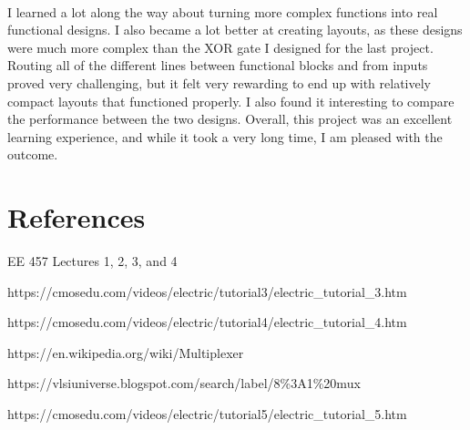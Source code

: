 \documentclass{article}
\begin{document}
  \paragraph{}
  I learned a lot along the way about turning more complex functions into real functional designs. I also became a lot better at creating layouts, as these designs were much more complex than the XOR gate I designed for the last project. Routing all of the different lines between functional blocks and from inputs proved very challenging, but it felt very rewarding to end up with relatively compact layouts that functioned properly. I also found it interesting to compare the performance between the two designs. Overall, this project was an excellent learning experience, and while it took a very long time, I am pleased with the outcome.

\newpage
\section{References}

\noindent [\text{1}] EE 457 Lectures 1, 2, 3, and 4

\noindent [\text{2}] https://cmosedu.com/videos/electric/tutorial3/electric\_tutorial\_3.htm 

\noindent [\text{3}] https://cmosedu.com/videos/electric/tutorial4/electric\_tutorial\_4.htm 

\noindent [\text{4}] https://en.wikipedia.org/wiki/Multiplexer

\noindent [\text{5}] https://vlsiuniverse.blogspot.com/search/label/8\%3A1\%20mux

\noindent [\text{6}] https://cmosedu.com/videos/electric/tutorial5/electric\_tutorial\_5.htm 

\end{document}
